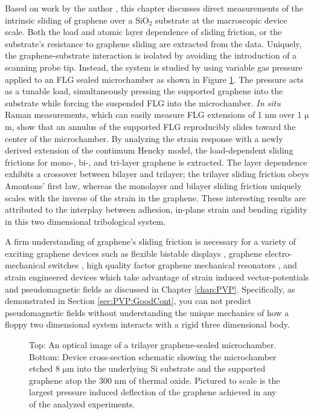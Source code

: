 Based on work by the author \cite{Kitt2013a}, this chapter discusses direct measurements of the intrinsic sliding of graphene over a $\mathrm{SiO_2}$ substrate at the macroscopic device scale.
Both the load and atomic layer dependence of sliding friction, or the substrate's resistance to graphene sliding are extracted from the data.
Uniquely, the graphene-substrate interaction is isolated by avoiding the introduction of a scanning probe tip.
Instead, the system is studied by using variable gas pressure applied to an FLG sealed microchamber as shown in Figure \ref{fig:fri:device}.
The pressure acts as a tunable load, simultaneously pressing the supported graphene into the substrate while forcing the suspended FLG into the microchamber.
\emph{In situ} Raman measurements, which can easily measure FLG extensions of 1 nm over 1 $\mathrm{\mu}$m, show that an annulus of the supported FLG reproducibly slides toward the center of the microchamber.
By analyzing the strain response with a newly derived extension of the continuum Hencky model, the load-dependent sliding frictions for mono-, bi-, and tri-layer graphene is extracted.
The layer dependence exhibits a crossover between bilayer and trilayer; the trilayer sliding friction obeys Amontons' first law, whereas the monolayer and bilayer sliding friction uniquely scales with the inverse of the strain in the graphene.
These interesting results are attributed to the interplay between adhesion, in-plane strain and bending rigidity in this two dimensional tribological system.

A firm understanding of graphene's sliding friction is necessary for a variety of exciting graphene devices such as flexible bistable displays \cite{Bonaccorso2010}, graphene electro-mechanical switches \cite{Milaninia2009}, high quality factor graphene mechanical resonators \cite{Kim2009b,Bunch2007,Chen2009,Barton2011}, and strain engineered devices \cite{Pereira2009a} which take advantage of strain induced vector-potentials and pseudomagnetic fields \cite{CastroNeto2009,Guinea2009,Kitt2012,Kitt2013} as discussed in Chapter \ref{chap:PVP}.
Specifically, as demonstrated in Section \ref{sec:PVP:GoodCont}, you can not predict pseudomagnetic fields without understanding the unique mechanics of how a floppy two dimensional system interacts with a rigid three dimensional body.

\begin{figure}
	\begin{center}
	
	\end{center}
	\caption[Schematic of devices used to measure graphene's macroscopic friction]{\label{fig:fri:device} Top: An optical image of a trilayer graphene-sealed microchamber. Bottom: Device cross-section schematic showing the microchamber etched 8 $\mathrm{\mu}$m into the underlying Si substrate and the supported graphene atop the 300 nm of thermal oxide.  Pictured to scale is the largest pressure induced deflection of the graphene achieved in any of the analyzed experiments.}
\end{figure}

